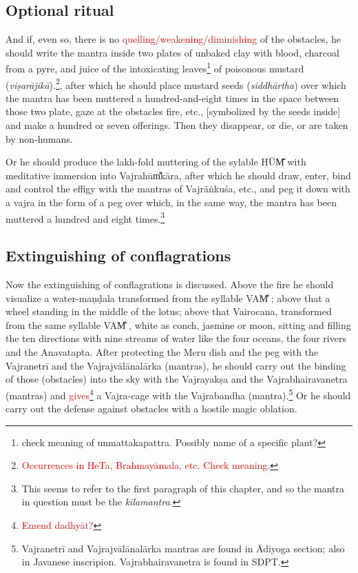 \documentclass[11pt]{book}
\makeatletter
\def\fakesc#1{%
  \begingroup%
  \xdef\fake@name{\csname\curr@fontshape/\f@size\endcsname}%
  \fontsize{1.3\fontdimen8\fake@name}{\baselineskip}\selectfont%
  \uppercase{#1}%
  \endgroup%
}
\newcommand{\mantra}[1]{\fakesc{#1}}
\newcommand{\red}[1]{\textcolor{red}{#1}}
\newcommand{\skt}[1]{\emph{#1}}
\makeatother
\begin{document}
\subsection{Optional ritual}
And if, even so, there is no \red{quelling/weakening/diminishing} of the obstacles, he should write the mantra inside two plates of unbaked clay with blood, charcoal from a pyre, and juice of the intoxicating leaves\footnote{check meaning of unmattakapattra. Possibly name of a specific plant?} of poisonous mustard (\skt{viṣarājikā}).\footnote{\red{Occurrences in HeTa, Brahmayāmala, etc. Check meaning}.}, after which he should place mustard seeds (\skt{siddhārtha}) over which the mantra has been muttered a hundred-and-eight times in the space between those two plate, gaze at the obstacles fire, etc., [symbolized by the seeds inside] and make a hundred or seven offerings. Then they disappear, or die, or are taken by non-humans.


Or he should produce the lakh-fold muttering of the sylable \mantra{hūm̐} with meditative immersion into Vajrahūm̐kāra, after which he should draw, enter, bind and control the effigy with the mantras of Vajrāṅkuśa, etc., and peg it down with a vajra in the form of a peg over which, in the same way, the mantra has been muttered a hundred and eight times.\footnote{This seems to refer to the first paragraph of this chapter, and so the mantra in question must be the \skt{kīlamantra}.}

\subsection{Extinguishing of conflagrations}
Now the extinguishing of conflagrations is discussed. Above the fire he should visualize a water-maṇḍala transformed from the syllable \mantra{vam̐}; above that a wheel standing in the middle of the lotus; above that Vairocana, transformed from the same syllable \mantra{vam̐}, white as conch, jasmine or moon, sitting and filling the ten directions with nine streams of water like the four oceans, the four rivers and the Anavatapta. After protecting the Meru dish and the peg with the Vajranetrī and the Vajrajvālānalārka (mantras), he should carry out the binding of those (obstacles) into the sky with the Vajrayakṣa and the Vajrabhairavanetra (mantras) and \red{gives}\footnote{\red{Emend dadhyāt?}} a Vajra-cage with the Vajrabandha (mantra).\footnote{Vajranetrī and Vajrajvālānalārka mantras are found in Ādiyoga section; also in Javanese inscripion. Vajrabhairavanetra is found in SDPT.} Or he should carry out the defense against obstacles with a hostile magic oblation.
\end{document}

